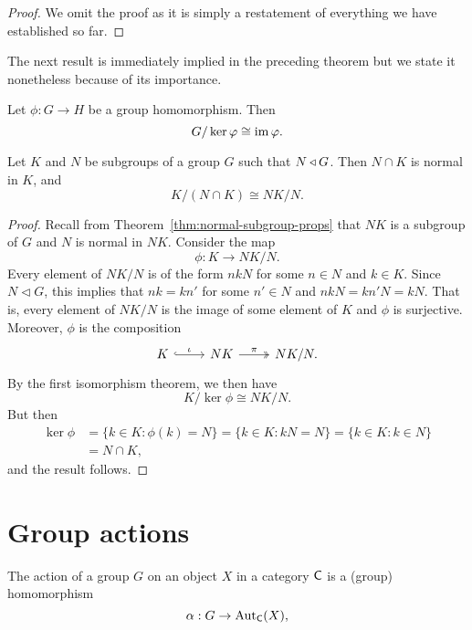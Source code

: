 \begin{proof}
    We omit the proof as it is simply a restatement of everything we have
    established so far.
\end{proof}

The next result is immediately implied in the preceding theorem but we state it
nonetheless because of its importance.

\begin{theorem}
    Let \(\phi: G \to H\) be a group homomorphism. Then
    \[
        G/\ker \varphi \cong \operatorname{im} \varphi.
    \]
\end{theorem}

\begin{theorem}
    Let \(K\) and \(N\) be subgroups of a group \(G\) such that
    \(N \triangleleft G\). Then \(N \cap K\) is normal in \(K\), and
    \[
        K/(N \cap K) \cong NK/N.
    \]
\end{theorem}

\begin{proof}
    Recall from Theorem~\ref{thm:normal-subgroup-props} that \(NK\) is a
    subgroup of \(G\) and \(N\) is normal in \(NK\). Consider the map
    \[
        \phi : K \to NK/N.
    \]
    Every element of \(NK/N\) is of the form \(nkN\) for some \(n \in N\) and
    \(k \in K\). Since \(N \triangleleft G\), this implies that \(nk = kn'\) for
    some \(n' \in N\) and \(nkN = kn'N = kN\). That is, every element of
    \(NK/N\) is the image of some element of \(K\) and \(\phi\) is surjective.
    Moreover, \(\phi\) is the composition
    \[
        \begin{tikzcd}
            K \arrow[r, "\iota", hook] & NK \arrow[r, "\pi", two heads] & NK/N.
            \end{tikzcd}
    \]
    By the first isomorphism theorem, we then have
    \[
        K/\ker \phi \cong NK/N.
    \]
    But then
    \begin{align*}
        \ker \phi &= \{k \in K : \phi(k) = N\} = \{k \in K : kN = N\} = \{k \in K : k \in N\}\\ &= N \cap K,
    \end{align*}
    and the result follows.
\end{proof}

\section{Group actions}

\begin{definition}
    The action of a group \(G\) on an object \(X\) in a category \(\mathsf{C}\) is
    a (group) homomorphism
    \[
        \alpha: G \to \operatorname{Aut}_{\mathsf{C}}(X),
    \]
\end{definition}